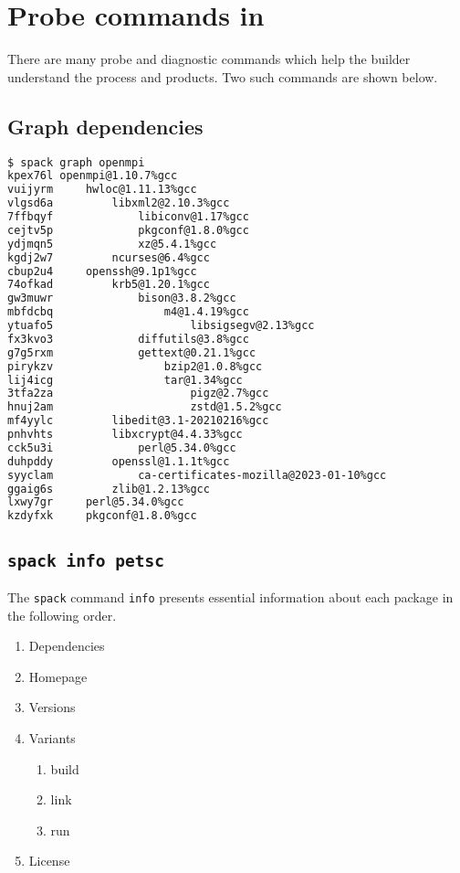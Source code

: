 \documentclass[10pt, oneside]{article}   	%
\begin{document}
\section{Probe commands in \spack}
There are many probe and diagnostic commands which help the builder understand the process and products. Two such commands are shown below.
\subsection{Graph dependencies}

\small{
\begin{lstlisting}[language=bash]
$ spack graph openmpi
kpex76l openmpi@1.10.7%gcc
vuijyrm     hwloc@1.11.13%gcc
vlgsd6a         libxml2@2.10.3%gcc
7ffbqyf             libiconv@1.17%gcc
cejtv5p             pkgconf@1.8.0%gcc
ydjmqn5             xz@5.4.1%gcc
kgdj2w7         ncurses@6.4%gcc
cbup2u4     openssh@9.1p1%gcc
74ofkad         krb5@1.20.1%gcc
gw3muwr             bison@3.8.2%gcc
mbfdcbq                 m4@1.4.19%gcc
ytuafo5                     libsigsegv@2.13%gcc
fx3kvo3             diffutils@3.8%gcc
g7g5rxm             gettext@0.21.1%gcc
pirykzv                 bzip2@1.0.8%gcc
lij4icg                 tar@1.34%gcc
3tfa2za                     pigz@2.7%gcc
hnuj2am                     zstd@1.5.2%gcc
mf4yylc         libedit@3.1-20210216%gcc
pnhvhts         libxcrypt@4.4.33%gcc
cck5u3i             perl@5.34.0%gcc
duhpddy         openssl@1.1.1t%gcc
syyclam             ca-certificates-mozilla@2023-01-10%gcc
ggaig6s         zlib@1.2.13%gcc
lxwy7gr     perl@5.34.0%gcc
kzdyfxk     pkgconf@1.8.0%gcc
\end{lstlisting}
}

\subsection{\texttt{spack info petsc}}
The \texttt{spack} command \texttt{info} presents essential information about each package in the following order. 
\begin{enumerate}
	\item Dependencies
	\item Homepage
	\item Versions
	\item Variants
	\begin{enumerate}
		\item build
		\item link
		\item run
	\end{enumerate}
	\item License
\end{enumerate}
\end{document}

